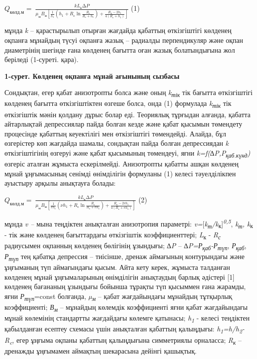 \(Q_{көлд.м} = \ \frac{kL_{к}\mathrm{\Delta}P}{\mu_{м}B_{м}\left\lbrack \frac{1}{h_{1}}\left( h_{1} + R_{с}\ln\frac{R_{с}}{R_{с} + h_{1}} \right) + \frac{R_{к} - 2h_{1}}{4\left( R_{с} + h_{1} \right)} \right\rbrack}\)
(1)

мұнда \emph{k} -- қарастырылып отырған жағдайда қабаттың өткізгіштігі
көлденең оқпанға мұнайдың түсуі оқпанға жазық -- радиалды перпендикуляр
және оқпан диаметрінің шегінде ғана көлденең бағытта оған жазық
болатындығына жол беріледі (1-суреті. қара).



{\bfseries 1-сурет. Көлденең оқпанға мұнай ағынының сызбасы}

Сондықтан, егер қабат анизотропты болса және оның
\emph{k\textsubscript{тік}} тік бағытта өткізгіштігі көлденең бағытта
өткізгіштіктен өзгеше болса, онда (1) формулада
\emph{k\textsubscript{тік}} тік өткізгіштік мәнін қолдану дұрыс болар
еді. Теориялық тұрғыдан алғанда, қабатта айтарлықтай депрессиялар пайда
болған кезде және қабат қысымын төмендету процесінде қабаттың
кеуектілігі мен өткізгіштігі төмендейді. Алайда, бұл өзгерістер көп
жағдайда шамалы, сондықтан пайда болған депрессиядан \emph{k}
өткізгіштігінің өзгеруі және қабат қысымының төмендеуі, яғни
\emph{k=f(∆P,P\textsubscript{қаб.күнд})} өзгеріс аталған жұмыста
ескерілмейді. Анизотропты қабатты ашқан көлденең мұнай ұңғымасының
сенімді өнімділігін формуланы (1) келесі тәуелділікпен ауыстыру арқылы
анықтауға болады:

\(Q_{көлд.м} = \ \frac{kL_{к}\mathrm{\Delta}P}{\mu_{м}B_{м}\left\lbrack \frac{1}{vh_{1}}\left( \nu h_{1} + R_{с}\ln\frac{R_{с}}{R_{с} + vh_{1}} \right) + \frac{R_{к} - 2vh_{1}}{4\left( R_{с} + vh_{1} \right)} \right\rbrack}\)
(2)

мұнда \emph{v --} мына теңдіктен анықталған анизотропия параметрі:
\emph{v=}{[}\emph{k\textsubscript{т}/k}\textsubscript{к}{]}\emph{\textsuperscript{0,5}},
\emph{k\textsubscript{т}, k}\textsubscript{к} - тік және көлденең
бағыттардағы өткізгіштік коэффициенттері; \emph{L}\textsubscript{к} -
\emph{R\textsubscript{с}} радиусымен оқпанның көлденең бөлігінің
ұзындығы; \emph{∆P} --
\emph{∆P=Р\textsubscript{қаб}-Р\textsubscript{түп}},
\emph{Р\textsubscript{қаб}}, \emph{Р\textsubscript{түп}} тең қабатқа
депрессия -- тиісінше, дренаж аймағының контурындағы және ұңғыманың түп
аймағындағы қысым. Айта кету керек, жұмыста талданған көлденең мұнай
ұңғымаларының өнімділігін анықтаудың барлық әдістері {[}1{]} көлденең
бағананың ұзындығы бойынша тұрақты түп қысыммен ғана жарамды, яғни
\emph{Р\textsubscript{түп}}=const болғанда, \emph{µ\textsubscript{м}} --
қабат жағдайындағы мұнайдың тұтқырлық коэффициенті;
\emph{В\textsubscript{м}} -- мұнайдың көлемдік коэффициенті яғни қабат
жағдайындағы мұнай көлемінің стандартты жағдайдағы көлемге қатынасы;
\emph{h\textsubscript{1}} - келесі теңдіктен қабылданған есептеу схемасы
үшін анықталған қабаттың қалыңдығы:
\emph{h\textsubscript{1}=h/h\textsubscript{2}-R\textsubscript{c}}, егер
ұңғыма оқпаны қабаттың қалыңдығына симметриялы орналасса;
\emph{R\textsubscript{к}} -- дренажды ұңғымамен аймақтың шекарасына
дейінгі қашықтық.

